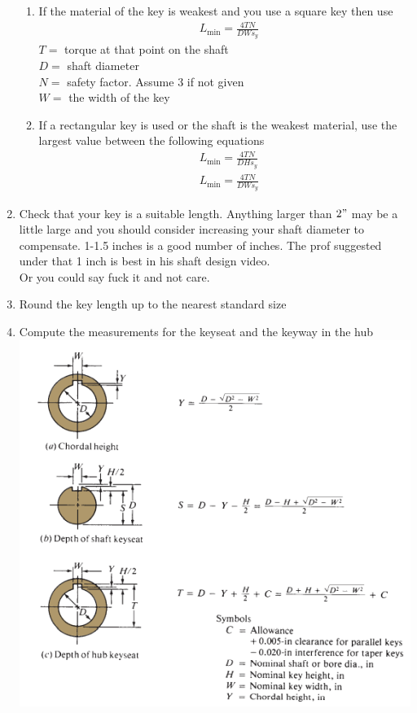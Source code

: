 \documentclass[11pt, fleqn]{article}
\begin{document}
\begin{enumerate}
\begin{enumerate}
        \item If the material of the key is weakest and you use a square key then use
        \begin{align*}
            &L_\text{min}=\frac{4TN}{DWs_y}
        \end{align*}
        $T=$ torque at that point on the shaft\\
        $D=$ shaft diameter\\
        $N=$ safety factor. Assume 3 if not given\\
        $W=$ the width of the key
        \item If a rectangular key is used or the shaft is the weakest material, use the largest value between the following equations
        \begin{align*}
            &L_\text{min}=\frac{4TN}{DHs_y}\\
            &L_\text{min}=\frac{4TN}{DWs_y}
        \end{align*}
    \end{enumerate}
    \item Check that your key is a suitable length. Anything larger than $2"$ may be a little large and you should consider increasing your shaft diameter to compensate. 1-1.5 inches is a good number of inches. The prof suggested under that 1 inch is best in his shaft design video.\\
    Or you could say fuck it and not care.
    \item Round the key length up to the nearest standard size
    \item Compute the measurements for the keyseat and the keyway in the hub\\
    \includegraphics[scale=1]{Shafts/Fig11-2.png}
\end{enumerate}
\end{document}
